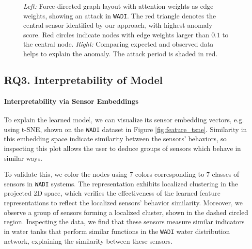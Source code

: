 \documentclass[letterpaper]{article} %
\begin{document}
\begin{figure}
\centering
{}
\caption{\emph{Left:} Force-directed graph layout with attention weights as edge weights, showing an attack in \texttt{WADI}. The red triangle denotes the central sensor identified by our approach, with highest anomaly score. Red circles indicate nodes with edge weights larger than $0.1$ to the central node. \emph{Right:} Comparing expected and observed data helps to explain the anomaly. The attack period is shaded in red.}
\label{fig:local}
\end{figure}

\subsection{RQ3. Interpretability of Model}
\paragraph{Interpretability via Sensor Embeddings} To explain the learned model, we can visualize its sensor embedding vectors, e.g. using t-SNE\cite{tsne}, shown on the \texttt{WADI} dataset in Figure \ref{fig:feature_tsne}. Similarity in this embedding space indicate similarity between the sensors' behaviors, so inspecting this plot allows the user to deduce groups of sensors which behave in similar ways. 

To validate this, we color the nodes using $7$ colors corresponding to $7$ classes of sensors in \texttt{WADI} systems. The representation exhibits localized clustering in the projected 2D space, which verifies the effectiveness of the learned feature representations to reflect the localized sensors' behavior similarity. Moreover, we observe a group of sensors forming a localized cluster, shown in the dashed circled region. Inspecting the data, we find that these sensors measure similar indicators in water tanks that perform similar functions in the \texttt{WADI} water distribution network, explaining the similarity between these sensors.
\end{document}

